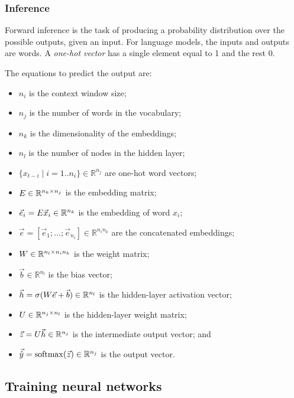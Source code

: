 \subsubsection{Inference}

Forward inference is the task of producing a probability distribution over the
possible outputs, given an input.
For language models, the inputs and outputs are words.
A \textit{one-hot vector} has a single element equal to 1 and the rest 0.

The equations to predict the output are:
\begin{itemize}
  \item $n_i$ is the context window size;
  \item $n_j$ is the number of words in the vocabulary;
  \item $n_k$ is the dimensionality of the embeddings;
  \item $n_l$ is the number of nodes in the hidden layer;
  \item $\{ x_{t - i} \mid i = 1 .. n_i \} \in \mathbb{R}^{n_j}$ are one-hot word vectors;
  \item $E \in \mathbb{R}^{n_k \times n_j}$ is the embedding matrix;
  \item $\vec{e}_i = E \vec{x}_i \in \mathbb{R}^{n_k}$ is the embedding
        of word $x_i$;
  \item $\vec{e} = [\vec{e}_1; \ldots; \vec{e}_{n_i}] \in \mathbb{R}^{n_i n_k}$
        are the concatenated embeddings;
  \item $W \in \mathbb{R}^{n_l \times n_i n_k}$ is the weight matrix;
  \item $\vec{b} \in \mathbb{R}^{n_l}$ is the bias vector;
  \item $\vec{h} = \sigma(W \vec{e} + \vec{b}) \in \mathbb{R}^{n_l}$ is
        the hidden-layer activation vector;
  \item $U \in \mathbb{R}^{n_j \times n_l}$ is the hidden-layer weight matrix;
  \item $\vec{z} = U \vec{h} \in \mathbb{R}^{n_j}$ is the intermediate
        output vector; and
  \item $\vec{\hat{y}} = \operatorname{softmax}(\vec{z}) \in \mathbb{R}^{n_j}$ is the output
        vector.
\end{itemize}

\subsection{Training neural networks}

